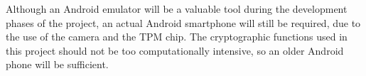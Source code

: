 Although an Android emulator will be a valuable tool during the development phases of the project, an actual Android smartphone will still be required, due to the use of the camera and the TPM chip. The cryptographic functions used in this project should not be too computationally intensive, so an older Android phone will be sufficient.
